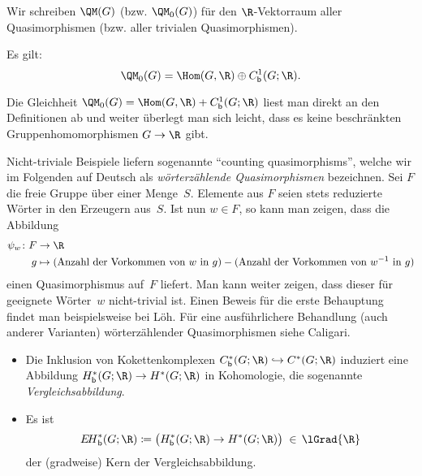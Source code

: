 \begin{thDef}
    Wir schreiben $\QM(G)$ (bzw. $\QM_0(G)$) für den $\R$-Vektorraum aller
    Quasimorphismen (bzw. aller trivialen Quasimorphismen). 
\end{thDef}

\begin{thProposition}
    \label{qmor:decompQM0}%
    Es gilt:
    \[ \QM_0(G) = \Hom(G,\R) \oplus \Cb^1(G;\R)  . \]
\end{thProposition}

\begin{proofsketch}
    Die Gleichheit $\QM_0(G) = \Hom(G,\R) + \Cb^1(G;\R)$ liest man direkt an den
    Definitionen ab und weiter überlegt man sich leicht, dass es keine beschränkten
    Gruppenhomomorphismen $G\to\R$ gibt.
    \\
\end{proofsketch}

\begin{thBeispiel}
    Nicht-triviale Beispiele liefern sogenannte \enquote{counting
    quasimorphisms}, welche wir im Folgenden auf Deutsch als
    \emph{wörterzählende Quasimorphismen} bezeichnen. Sei $F$ die freie Gruppe
    über einer Menge~$S$. Elemente aus $F$ seien stets reduzierte Wörter in den
    Erzeugern aus~$S$. Ist nun $w\in F$, so kann man zeigen, dass die Abbildung
    \begin{align*}
        \psi_w\colon F &\to \R  \\
        g &\mapsto (\text{Anzahl der Vorkommen von $w$ in $g$})
                 - (\text{Anzahl der Vorkommen von $w^{-1}$ in $g$})
    \end{align*}
    einen Quasimorphismus auf~$F$ liefert. Man kann weiter zeigen, dass dieser
    für geeignete Wörter~$w$ nicht-trivial ist. Einen Beweis für die erste
    Behauptung findet man beispielsweise bei
    Löh\cite[Ch.\,2,.3,\;Lemma~2.5.11]{lecnotes:loeh:bdcoho}.
    Für eine ausführlichere Behandlung (auch anderer Varianten) wörterzählender
    Quasimorphismen siehe Caligari\cite[Ch.\,2,.2]{bookc:calegari09}.
\end{thBeispiel}

\begin{thErinnerDef} \hfill
    \begin{itemize}
        \item
            Die Inklusion von Kokettenkomplexen $\Cb^\ast(G;\R) \hookrightarrow
            C^\ast(G;\R)$ induziert eine Abbildung $\Hb^\ast(G;\R) \to
            H^\ast(G;\R)$ in Kohomologie, die sogenannte
            \emph{Vergleichsabbildung}.
        \item
            Es ist
            \[ \EHb^\ast(G;\R)
                \defeq \ker\bigl( \Hb^\ast(G;\R) \to H^\ast(G;\R) \bigr)
                \;\in\, \lGrad{\R}
            \]
            der (gradweise) Kern der Vergleichsabbildung.
    \end{itemize}
\end{thErinnerDef}

